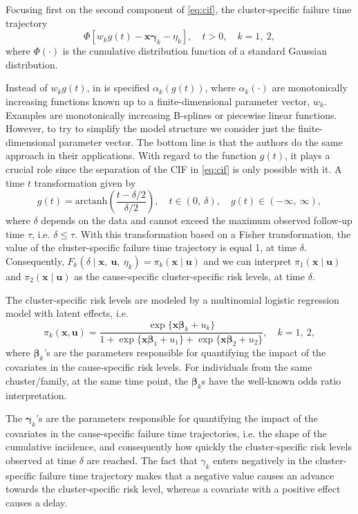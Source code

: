 Focusing first on the second component of \autoref{eq:cif}, the
cluster-specific failure time trajectory
\[
  \Phi[w_{k} g(t) - \mathbf{x}\bm{\gamma}_{k} - \eta_{k}],
  \quad t > 0, \quad k = 1,~2,
\]
where \(\Phi(\cdot)\) is the cumulative distribution function of a
standard Gaussian distribution.

Instead of \(w_{k} g(t)\), in  is specified
\(\alpha_{k}(g(t))\), where \(\alpha_{k}(\cdot)\) are monotonically
increasing functions known up to a finite-dimensional parameter vector,
\(w_{k}\). Examples are monotonically increasing B-splines or piecewise
linear functions. However, to try to simplify the model structure we
consider just the finite-dimensional parameter vector. The bottom line
is that the authors do the same approach in their applications. With
regard to the function \(g(t)\), it plays a crucial role since the
separation of the CIF in \autoref{eq:cif} is only possible with it. A
time \(t\) transformation given by
\[
  g(t) = \text{arctanh}\left(\frac{t - \delta/2}{\delta/2}\right),
  \quad t\in(0,~\delta), \quad g(t)\in(-\infty,~\infty),
\]
where \(\delta\) depends on the data and cannot exceed the maximum
observed follow-up time \(\tau\), i.e. \(\delta \leq \tau\). With this
transformation based on a Fisher transformation, the value of the
cluster-specific failure time trajectory is equal 1, at time \(\delta\).
Consequently, \(F_{k} (\delta \mid \mathbf{x},~\bm{u},~\eta_{k}) =
\pi_{k}(\mathbf{x} \mid \bm{u})\) and we can interpret
\(\pi_{1}(\mathbf{x} \mid \bm{u})\) and \(\pi_{2}(\mathbf{x} \mid
\bm{u})\) as the cause-specific cluster-specific risk levels, at time
\(\delta\).

The cluster-specific risk levels are modeled by a multinomial logistic
regression model with latent effects, i.e.
\begin{equation}
  \pi_{k}(\mathbf{x}, \bm{u}) =
  \frac{\exp\{\mathbf{x}\bm{\beta}_{k} + u_{k}\}}{1 +
    \exp\{\mathbf{x}\bm{\beta}_{1} + u_{1}\} +
    \exp\{\mathbf{x}\bm{\beta}_{2} + u_{2}\}}, \quad k = 1,~2,
  \label{eq:risklevel}
\end{equation}
where \(\bm{\beta}_{k}\)'s are the parameters responsible for
quantifying the impact of the covariates in the cause-specific risk
levels. For individuals from the same chuster/family, at the same time
point, the \(\bm{\beta}_{k}\)s have the well-known odds ratio
interpretation.

The \(\bm{\gamma}_{k}\)'s are the parameters responsible for quantifying
the impact of the covariates in the cause-specific failure time
trajectories, i.e. the shape of the cumulative incidence, and
consequently how quickly the cluster-specific risk levels observed at
time \(\delta\) are reached. The fact that \(\gamma_{k}\) enters
negatively in the cluster-specific failure time trajectory makes that a
negative value causes an advance towards the cluster-specific risk
level, whereas a covariate with a positive effect causes a delay.

